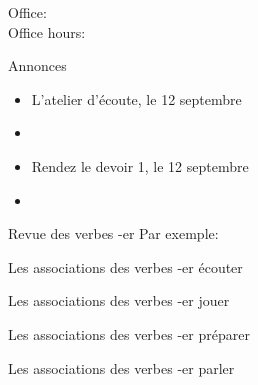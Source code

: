 \documentclass{beamer}
\subtitle[Activités]{Nos activités}
\begin{document}
  \begin{frame}
    \titlepage
    \tiny{Office: \\
          Office hours: }
  \end{frame}

  \begin{frame}{Annonces}
    \begin{itemize}
      \item L'atelier d'écoute, le 12 septembre
      \item[] 
      \item Rendez le devoir 1, le 12 septembre
      \item[] 
    \end{itemize}
  \end{frame}

  \begin{frame}{Revue des verbes -er}
    Par exemple:
    \begin{center}
      
    \end{center}
  \end{frame}

  \begin{frame}{Les associations des verbes -er}
    \centering
    écouter

  \end{frame}

  \begin{frame}{Les associations des verbes -er}
    \centering
    jouer

  \end{frame}

  \begin{frame}{Les associations des verbes -er}
    \centering
    préparer

  \end{frame}

  \begin{frame}{Les associations des verbes -er}
    \centering
    parler

  \end{frame}
\end{document}
